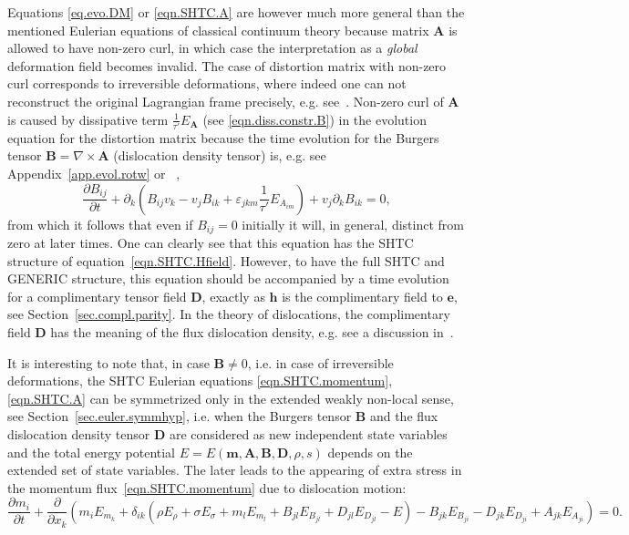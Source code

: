 \documentclass[twoside]{article}
\newcommand{\AAA}{{\boldsymbol{A}}}
\newcommand{\mm}{{\boldsymbol{m}}}
\newcommand{\ee}{{\boldsymbol{e}}}
\newcommand{\hh}{{\boldsymbol{h}}}
\newcommand{\DD}{{\boldsymbol{D}}}
\newcommand{\BB}{{\boldsymbol{B}}}
\newcommand{\ted}{E} %
\newcommand{\pd}{\partial}
\newcommand{\eps}{\varepsilon}
\begin{document}
Equations \eqref{eq.evo.DM} or \eqref{eqn.SHTC.A}  are however much 
more general than the mentioned 
Eulerian equations of classical continuum theory because matrix $ \AAA $ is 
allowed to have 
non-zero curl, in which case the interpretation as a \textit{global} 
deformation field becomes 
invalid. The case of distortion matrix with non-zero curl corresponds to 
irreversible deformations, where indeed one can not reconstruct the original 
Lagrangian frame precisely, e.g. 
see~\cite{God1978,Rom1989,GodRom1998,GodRom2003}. 
Non-zero curl of $ \AAA $ is caused by 
dissipative term $ \frac{1}{\tau'}\ted_{\AAA} $ (see \eqref{eqn.diss.constr.B}) 
in 
the evolution equation for the 
distortion matrix because the time evolution for the Burgers tensor $ \BB = 
\nabla\times\AAA $ (dislocation density tensor) is, e.g. 
see Appendix~\ref{app.evol.rotw} or 
~\cite{God1978,GodRom1998,GodRom2003,PeshGrmRom2015},
\begin{equation}\label{eqn.Burg.PDE}
\frac{\pd B_{ij}}{\pd t} + \pd_k \left (B_{ij} v_k - v_j B_{ik} + 
\eps_{jkm}\frac{1}{\tau'}\ted_{A_{im}}\right ) + v_j \pd_k B_{ik} = 0,
\end{equation}
from which it follows that even if $ B_{ij} = 0 $ initially it will, in 
general, distinct from zero at later times. One can clearly see that this 
equation has the SHTC structure of equation~\eqref{eqn.SHTC.Hfield}. However, 
to have the full SHTC and GENERIC structure, this equation should be 
accompanied by a time evolution for a complimentary tensor field $ \DD $, 
exactly as $ 
\hh $ is the complimentary field to $ \ee $, see 
Section~\ref{sec.compl.parity}. In the theory of dislocations, the 
complimentary field $ \DD $ has the meaning of the flux dislocation density, 
e.g. see a discussion in~\cite{PeshGrmRom2015}.

It is interesting to note that, in case $ \BB \neq 0 $, i.e. in case of 
irreversible deformations, the SHTC Eulerian 
equations \eqref{eqn.SHTC.momentum}, \eqref{eqn.SHTC.A} can be symmetrized only 
in the extended weakly non-local sense, see Section~\ref{sec.euler.symmhyp}, 
i.e. when the Burgers tensor $ \BB $ and the flux dislocation density tensor $ 
\DD $ are considered as new independent state variables and the total energy 
potential $ E = E(\mm,\AAA,\BB,\DD,\rho,s) $ depends on the extended set of 
state variables. The later leads to the appearing of extra stress in the 
momentum flux~\eqref{eqn.SHTC.momentum} due to dislocation motion:
\begin{equation}\label{eqn.disl.momentum}
\frac{\pd m_i }{\pd t} + \frac{\pd }{\pd 
	x_k}\left(m_i \ted_{m_k} + \delta_{ik} \left( \rho \ted_\rho  + \sigma 
	\ted_\sigma 
	+ m_l\ted_{m_l} + B_{jl} \ted_{B_{jl}} + D_{jl} \ted_{D_{jl}} - \ted 
	\right) - B_{jk} \ted_{B_{ji}} -  D_{jk} \ted_{D_{ji}} + 
	A_{jk}\ted_{A_{ji}}\right)=0.
\end{equation}
\end{document}
